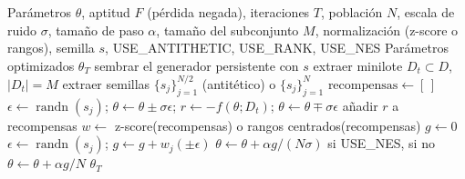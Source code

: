 \begin{algorithm}[H]
\caption{EA4LLM (Estrategias Evolutivas de Orden Cero)}
\label{alg:ea4llm}
\begin{algorithmic}[1]
\Require Parámetros $\theta$, aptitud $F$ (pérdida negada), iteraciones $T$, población $N$, escala de ruido $\sigma$, tamaño de paso $\alpha$, tamaño del subconjunto $M$, normalización (z-score o rangos), semilla $s$, USE\_ANTITHETIC, USE\_RANK, USE\_NES
\Ensure Parámetros optimizados $\theta_T$
\State sembrar el generador persistente con $s$
    \State extraer minilote $D_t \subset D$, $|D_t| = M$ 
    \State extraer semillas $\{s_j\}_{j=1}^{N/2}$ (antitético) o $\{s_j\}_{j=1}^{N}$
    \State $\text{recompensas} \gets [\,]$ 
        \State $\epsilon \gets \operatorname{randn}(s_j)$; \quad $\theta \gets \theta \pm \sigma\epsilon$; \quad $r \gets -f(\theta; D_t)$; \quad $\theta \gets \theta \mp \sigma\epsilon$
        \State añadir $r$ a recompensas
    \EndFor
    \State $w \gets$ z-score(recompensas) o rangos centrados(recompensas)
    \State $g \gets 0$ 
        \State $\epsilon \gets \operatorname{randn}(s_j)$; \quad $g \gets g + w_j (\pm\epsilon)$
    \EndFor
    \State $\theta \gets \theta + \alpha g / (N\sigma)$ si USE\_NES, si no $\theta \gets \theta + \alpha g / N$
\EndFor
\State \Return $\theta_T$
\end{algorithmic}
\end{algorithm}


